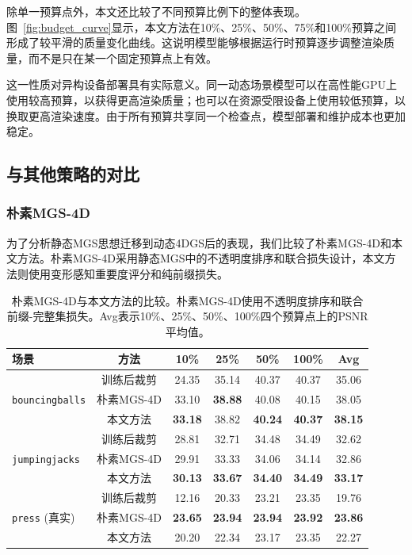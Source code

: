 \documentclass[sn-mathphys]{sn-jnl}
\begin{document}
除单一预算点外，本文还比较了不同预算比例下的整体表现。图~\ref{fig:budget_curve}显示，本文方法在10\%、25\%、50\%、75\%和100\%预算之间形成了较平滑的质量变化曲线。这说明模型能够根据运行时预算逐步调整渲染质量，而不是只在某一个固定预算点上有效。

这一性质对异构设备部署具有实际意义。同一动态场景模型可以在高性能GPU上使用较高预算，以获得更高渲染质量；也可以在资源受限设备上使用较低预算，以换取更高渲染速度。由于所有预算共享同一个检查点，模型部署和维护成本也更加稳定。

\subsection{与其他策略的对比}
\label{sec:comparisons}

\subsubsection{朴素MGS-4D}

为了分析静态MGS思想迁移到动态4DGS后的表现，我们比较了朴素MGS-4D和本文方法。朴素MGS-4D采用静态MGS中的不透明度排序和联合损失设计，本文方法则使用变形感知重要度评分和纯前缀损失。

\begin{table}[!htbp]
\caption{朴素MGS-4D与本文方法的比较。朴素MGS-4D使用不透明度排序和联合前缀-完整集损失。Avg表示10\%、25\%、50\%、100\%四个预算点上的PSNR平均值。}
\label{tab:naive_mgs}
\centering
\small
\setlength{\tabcolsep}{4pt}
\begin{tabular}{lcccccc}
\toprule
场景 & 方法 & 10\% & 25\% & 50\% & 100\% & Avg \\
\midrule
\multirow{3}{*}{\texttt{bouncingballs}} & 训练后裁剪   & 24.35 & 35.14 & 40.37 & 40.37 & 35.06 \\
& 朴素MGS-4D & 33.10 & \textbf{38.88} & 40.08 & 40.15 & 38.05 \\
& 本文方法      & \textbf{33.18} & 38.82 & \textbf{40.24} & \textbf{40.37} & \textbf{38.15} \\
\midrule
\multirow{3}{*}{\texttt{jumpingjacks}} & 训练后裁剪   & 28.81 & 32.71 & 34.48 & 34.49 & 32.62 \\
& 朴素MGS-4D & 29.91 & 33.33 & 34.06 & 34.14 & 32.86 \\
& 本文方法      & \textbf{30.13} & \textbf{33.67} & \textbf{34.40} & \textbf{34.49} & \textbf{33.17} \\
\midrule
\multirow{3}{*}{\texttt{press} (真实)} & 训练后裁剪   & 12.16 & 20.33 & 23.21 & 23.35 & 19.76 \\
& 朴素MGS-4D & \textbf{23.65} & \textbf{23.94} & \textbf{23.94} & \textbf{23.92} & \textbf{23.86} \\
& 本文方法      & 20.20 & 22.34 & 23.17 & 23.35 & 22.27 \\
\bottomrule
\end{tabular}
\end{table}
\end{document}
